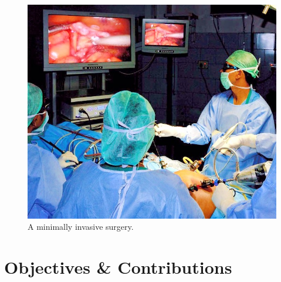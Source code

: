 \documentclass[12pt]{report}
\begin{document}
\begin{figure}[H]
\centerline{\includegraphics[scale = 0.5]{img/laparoscopy.jpg}}
\caption{A minimally invasive surgery.}
\label{laparoscopy}
\end{figure}



\section{Objectives \& Contributions} \label{sec:objectives} 
\end{document}
